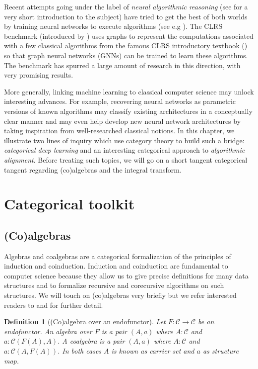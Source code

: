 \documentclass[11pt,a4paper,openright,twoside]{report}
\newcounter{mycounter}
\theoremstyle{plain}
\newtheorem{definition}[mycounter]{Definition}
\theoremstyle{definition}
\begin{document}
Recent attempts going under the label of \textit{neural algorithmic reasoning} (see \cite{velivckovic2021neural} for a very short introduction to the subject) have tried to get the best of both worlds by training neural networks to execute algorithms (see e.g \cite{ibarz2022generalist}). The CLRS benchmark (introduced by \cite{velivckovic2022clrs}) uses graphs to represent the computations associated with a few classical algorithms from the famous CLRS introductory textbook (\cite{cormen2022introduction}) so that graph neural networks (GNNs) can be trained to learn these algorithms. The benchmark has spurred a large amount of research in this direction, with very promising results.


More generally, linking machine learning to classical computer science may unlock interesting advances. For example, recovering neural networks as parametric versions of known algorithms may classify existing architectures in a conceptually clear manner and may even help develop new neural network architectures by taking inspiration from well-researched classical notions. In this chapter, we illustrate two lines of inquiry which use category theory to build such a bridge: \textit{categorical deep learning} and an interesting categorical approach to \textit{algorithmic alignment}. Before treating such topics, we will go on a short tangent categorical tangent regarding (co)algebras and the integral transform.




\section{Categorical toolkit}

\subsection{(Co)algebras}
\label{subsec: algebras}

Algebras and coalgebras are a categorical formalization of the principles of induction and coinduction. Induction and coinduction are fundamental to computer science because they allow us to give precise definitions for many data structures and to formalize recursive and corecursive algorithms on such structures. We will touch on (co)algebras very briefly but we refer interested readers to \cite{jacobs1997tutorial} and \cite{wisbauer2008algebras} for further detail.

\begin{definition}[(Co)algebra over an endofunctor]
  \label{def: endalg}
  Let $F: \mathcal{C} \to \mathcal{C}$ be an endofunctor. An algebra over $F$ is a pair $(A,a)$ where $A: \mathcal{C}$ and $a:\mathcal{C}(F(A),A)$. A coalgebra is a pair $(A,a)$ where $A: \mathcal{C}$ and $a:\mathcal{C}(A,F(A))$. In both cases $A$ is known as carrier set and $a$ as structure map.
\end{definition}
\end{document}
